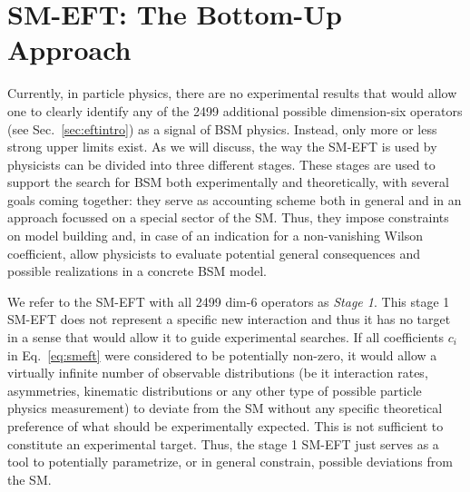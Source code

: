 
\section{SM-EFT: The Bottom-Up Approach}
\label{sec:classification}

Currently, in particle physics, there are no experimental
results that would allow one to clearly identify any of the 2499 additional possible
dimension-six operators
(see Sec.~\ref{sec:eftintro}) as a signal of BSM physics. 
Instead, only more or less strong upper limits exist.
As we will discuss, the way the SM-EFT is used by physicists can be divided into three different stages.
These stages are used to support the search for BSM both experimentally and theoretically,
with several goals coming together: they serve as accounting scheme both in general and in an approach focussed on a special sector of the SM. 
Thus, they impose constraints on model building and, in case of an indication for a non-vanishing
Wilson coefficient, allow physicists to evaluate potential general consequences and possible 
realizations in a concrete BSM model.

We refer to the SM-EFT with all 2499 dim-6 operators as \emph{Stage 1}.
This stage 1 SM-EFT does not represent a specific new interaction
and thus it has no target in a sense that would allow it to
guide experimental searches.  
If all coefficients $c_i$ in Eq.~\ref{eq:smeft}
were considered to be potentially non-zero, it would allow a virtually infinite number 
of observable distributions (be it interaction rates, asymmetries, kinematic
distributions or any other type of possible particle physics measurement) 
to deviate from the SM without
any specific theoretical preference of what should be experimentally
expected.
This is not sufficient to constitute an experimental target. 
Thus, the stage 1 SM-EFT just serves as a tool to potentially parametrize, or in general
constrain, possible deviations from the SM. 

